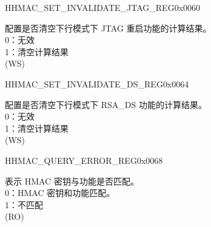    \begin{register}{H}{HMAC\_SET\_INVALIDATE\_JTAG\_REG}{0x0060}\label{regdesc:HMACSETINVALIDATEJTAGREG}
    \regnewline%
    \begin{regdesc}\begin{reglist}
    \label{fielddesc:HMACSETINVALIDATEJTAG}\item [HMAC\_SET\_INVALIDATE\_JTAG] 配置是否清空下行模式下 JTAG 重启功能的计算结果。
    \\0：无效
    \\1：清空计算结果 
    \\(WS)
    \end{reglist}\end{regdesc}
    \end{register}


    \begin{register}{H}{HMAC\_SET\_INVALIDATE\_DS\_REG}{0x0064}\label{regdesc:HMACSETINVALIDATEDSREG}
    \regnewline%
    \begin{regdesc}\begin{reglist}
    \label{fielddesc:HMACSETINVALIDATEDS}\item [HMAC\_SET\_INVALIDATE\_DS]  配置是否清空下行模式下 RSA\_DS 功能的计算结果。
    \\0：无效
    \\1：清空计算结果 
    \\(WS)
    \end{reglist}\end{regdesc}
    \end{register}


    \begin{register}{H}{HMAC\_QUERY\_ERROR\_REG}{0x0068}\label{regdesc:HMACQUERYERRORREG}
    \regnewline%
    \begin{regdesc}\begin{reglist}
    \label{fielddesc:HMACQUREYCHECK}\item [HMAC\_QUREY\_CHECK] 表示 HMAC 密钥与功能是否匹配。
    \\0：HMAC 密钥和功能匹配。
    \\1：不匹配
    \\(RO)
    \end{reglist}\end{regdesc}
    \end{register}


